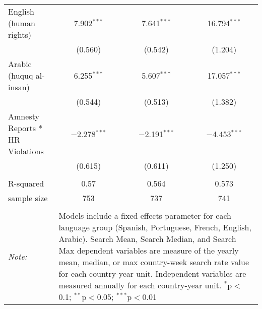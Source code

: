 \begin{table}[!htbp]
\begin{tabular}{@{\extracolsep{5pt}}lccc}
  English (human rights) & 7.902$^{***}$ & 7.641$^{***}$ & 16.794$^{***}$ \\ 
  & (0.560) & (0.542) & (1.204) \\ 
  Arabic (huquq al-insan) & 6.255$^{***}$ & 5.607$^{***}$ & 17.057$^{***}$ \\ 
  & (0.544) & (0.513) & (1.382) \\ 
  Amnesty Reports * HR Violations & $-$2.278$^{***}$ & $-$2.191$^{***}$ & $-$4.453$^{***}$ \\ 
  & (0.615) & (0.611) & (1.250) \\ 
 \hline \\[-1.8ex] 
R-squared  & 0.57 & 0.564 & 0.573 \\ 
sample size  & 753 & 737 & 741 \\ 
\hline 
\hline \\[-1.8ex] 
\textit{Note:}  & \multicolumn{3}{l}{\parbox[t]{8cm}{Models include a fixed effects parameter for each language group (Spanish, Portuguese, French, English, Arabic). Search Mean, Search Median, and Search Max dependent variables are measure of the yearly mean, median, or max country-week search rate value for each country-year unit. Independent variables are measured annually for each country-year unit. $^{*}$p$<$0.1; $^{**}$p$<$0.05; $^{***}$p$<$0.01}} \\ 
\end{tabular} 
\end{table} 
